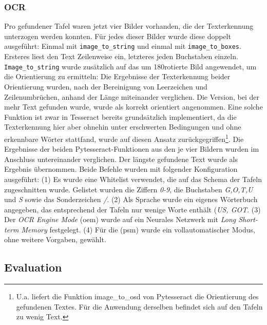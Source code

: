 \subsubsection{OCR}

Pro gefundener Tafel waren jetzt vier Bilder vorhanden, die der Texterkennung unterzogen werden konnten. Für jedes dieser Bilder wurde diese doppelt ausgeführt: Einmal mit \verb|image_to_string| und einmal mit \verb|image_to_boxes|. Ersteres liest den Text Zeilenweise ein, letzteres jeden Buchstaben einzeln. \verb|Image_to_string| wurde zusätzlich auf das um 180\degree rotierte Bild angewendet, um die Orientierung zu ermitteln: Die Ergebnisse der Texterkennung beider Orientierung wurden, nach der Bereinigung von Leerzeichen und Zeilenumbrüchen, anhand der Länge miteinander verglichen. Die Version, bei der mehr Text gefunden wurde, wurde als korrekt orientiert angenommen. Eine solche Funktion ist zwar in Tesseract bereits grundsätzlich implementiert, da die Texterkennung hier aber ohnehin unter erschwerten Bedingungen und ohne erkennbare Wörter stattfand, wurde auf diesen Ansatz zurückgegriffen\footnote{U.a. liefert die Funktion image\_to\_osd von Pytesseract die Orientierung des gefundenen Textes. Für die Anwendung derselben befindet sich auf den Tafeln zu wenig Text.}.
Die Ergebnisse der beiden Pytesseract-Funktionen aus den je vier Bildern wurden im Anschluss untereinander verglichen. Der längste gefundene Text wurde als Ergebnis übernommen.
Beide Befehle wurden mit folgender Konfiguration ausgeführt: (1) Es wurde eine Whitelist verwendet, die auf das Schema der Tafeln zugeschnitten wurde. Gelistet wurden die Ziffern \textit{0-9}, die Buchstaben \textit{G,O,T,U} und \textit{S} sowie das Sonderzeichen \textit{/}. (2) Als Sprache wurde ein eigenes Wörterbuch angegeben, das entsprechend der Tafeln nur wenige Worte enthält (\textit{US, GOT}. (3) Der \textit{OCR Engine Mode} (oem) wurde auf ein Neurales Netzwerk mit \textit{Long Short-term Memory}\cite{hochreitersepp} festgelegt. (4) Für die  (psm) wurde ein vollautomatischer Modus, ohne weitere Vorgaben, gewählt.


\subsection{Evaluation}